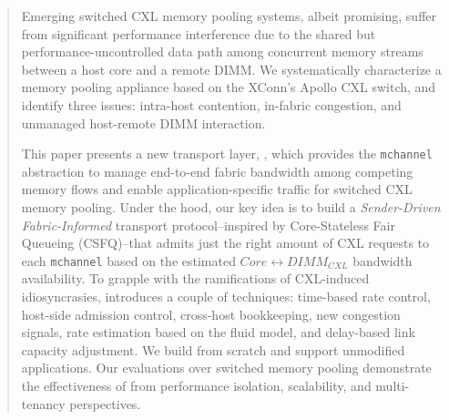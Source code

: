 \maketitle
\begin{abstract}
\label{sec:abst}

Emerging switched CXL memory pooling systems, albeit promising, suffer from significant performance interference due to the shared but performance-uncontrolled data path among concurrent memory streams between a host core and a remote DIMM. We systematically characterize a memory pooling appliance based on the XConn’s Apollo CXL switch, and identify three issues: intra-host contention, in-fabric congestion, and unmanaged host-remote DIMM interaction.


This paper presents a new transport layer, {\bf \sys}, which provides the \texttt{mchannel} abstraction to manage end-to-end fabric bandwidth among competing memory flows and enable application-specific traffic for switched CXL memory pooling. Under the hood, our key idea is to build a {\it Sender-Driven Fabric-Informed} transport protocol--inspired by Core-Stateless Fair Queueing (CSFQ)--that admits just the right amount of CXL requests to each \texttt{mchannel} based on the estimated $Core \leftrightarrow DIMM_{CXL}$ bandwidth availability. To grapple with the ramifications of CXL-induced idiosyncrasies, \sys introduces a couple of techniques: time-based rate control, host-side admission control, cross-host bookkeeping, new congestion signals, rate estimation based on the fluid model, and delay-based link capacity adjustment. We build \sys from scratch and support unmodified applications. Our evaluations over switched memory pooling demonstrate the effectiveness of \sys from performance isolation, scalability, and multi-tenancy perspectives.


\end{abstract}

